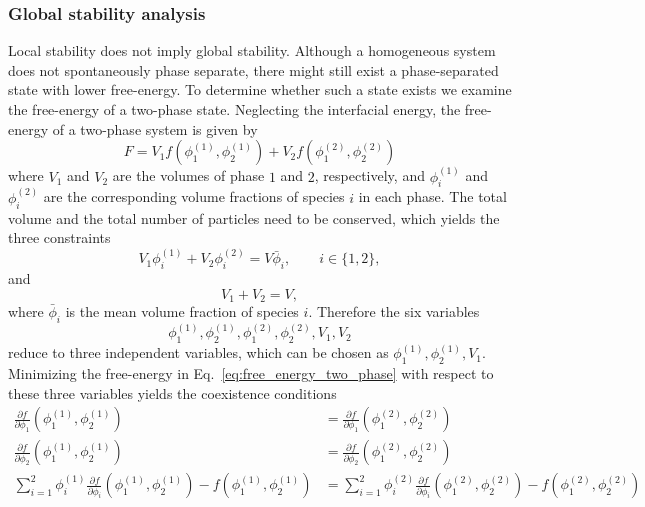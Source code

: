 \documentclass[12pt]{article}
\begin{document}
\subsubsection{Global stability analysis}
Local stability does not imply global stability. Although a homogeneous system does not spontaneously phase separate, there might still exist a phase-separated state with lower free-energy. To determine whether such a state exists we examine the free-energy of a two-phase state.
Neglecting the interfacial energy, the free-energy of a two-phase system is given by
\begin{equation}
    F = V_1 f(\phi_1^{(1)},\phi_2^{(1)}) + V_2 f(\phi_1^{(2)},\phi_2^{(2)})
    \label{eq:free_energy_two_phase}
\end{equation}
where \(V_1\) and \(V_2\) are the volumes of phase \(1\) and \(2\), respectively, and \(\phi_i^{(1)}\) and \(\phi_i^{(2)}\) are the corresponding volume fractions of species \(i\) in each phase.
The total volume and the total number of particles need to be conserved, which yields the three constraints
\[
    V_1 \phi_i^{(1)} + V_2 \phi_i^{(2)} = V\bar\phi_i, \qquad i \in \{1,2\},
\]
and
\[
     V_1 + V_2 = V,
\]
where \(\bar\phi_i\) is the mean volume fraction of species \(i\). Therefore the six variables \[\phi_1^{(1)}, \phi_2^{(1)}, \phi_1^{(2)}, \phi_2^{(2)}, V_1, V_2\] reduce to three independent variables, which can be chosen as \(\phi_1^{(1)}, \phi_2^{(1)}, V_1\).
Minimizing the free-energy in Eq.~\eqref{eq:free_energy_two_phase} with respect to these three variables yields the coexistence conditions
\begin{equation}
    \begin{aligned}
        \frac{\partial f}{\partial \phi_1}(\phi_1^{(1)},\phi_2^{(1)}) &= \frac{\partial f}{\partial \phi_1}(\phi_1^{(2)},\phi_2^{(2)}) \\
        \frac{\partial f}{\partial \phi_2}(\phi_1^{(1)},\phi_2^{(1)}) &= \frac{\partial f}{\partial \phi_2}(\phi_1^{(2)},\phi_2^{(2)}) \\
        \sum_{i=1}^2 \phi_i^{(1)} \frac{\partial f}{\partial \phi_i}(\phi_1^{(1)},\phi_2^{(1)}) - f(\phi_1^{(1)},\phi_2^{(1)}) &= \sum_{i=1}^2 \phi_i^{(2)} \frac{\partial f}{\partial \phi_i}(\phi_1^{(2)},\phi_2^{(2)}) - f(\phi_1^{(2)},\phi_2^{(2)})
    \end{aligned}
    \label{eq:coexistence_conditions_derivation}
\end{equation}
\end{document}
